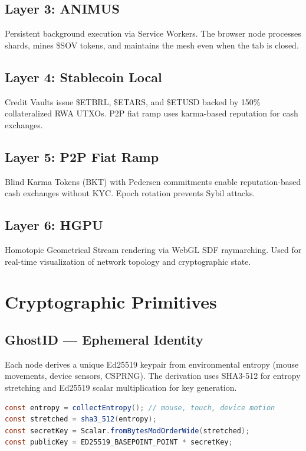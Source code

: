 \documentclass[11pt,a4paper]{article}
\begin{document}
\subsection{Layer 3: ANIMUS}
Persistent background execution via Service Workers. The browser node processes shards, mines \$SOV tokens, and maintains the mesh even when the tab is closed.

\subsection{Layer 4: Stablecoin Local}
Credit Vaults issue \$ETBRL, \$ETARS, and \$ETUSD backed by 150\% collateralized RWA UTXOs. P2P fiat ramp uses karma-based reputation for cash exchanges.

\subsection{Layer 5: P2P Fiat Ramp}
Blind Karma Tokens (BKT) with Pedersen commitments enable reputation-based cash exchanges without KYC. Epoch rotation prevents Sybil attacks.

\subsection{Layer 6: HGPU}
Homotopic Geometrical Stream rendering via WebGL SDF raymarching. Used for real-time visualization of network topology and cryptographic state.

\section{Cryptographic Primitives}

\subsection{GhostID --- Ephemeral Identity}
Each node derives a unique Ed25519 keypair from environmental entropy (mouse movements, device sensors, CSPRNG). The derivation uses SHA3-512 for entropy stretching and Ed25519 scalar multiplication for key generation.

\begin{lstlisting}[language=Java, caption=GhostID Derivation]
const entropy = collectEntropy(); // mouse, touch, device motion
const stretched = sha3_512(entropy);
const secretKey = Scalar.fromBytesModOrderWide(stretched);
const publicKey = ED25519_BASEPOINT_POINT * secretKey;
\end{lstlisting}
\end{document}
